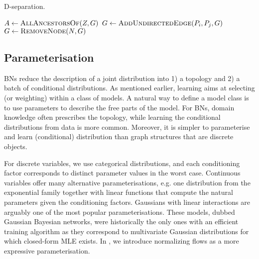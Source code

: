 \begin{algorithm}
\caption{D-separation.}\label{alg:d-separation}
  \begin{algorithmic}
      \State {}
      \State {}
      \State $A \gets \Call{AllAncestorsOf}{Z, G}$
       
          \State $G \gets \Call{AddUndirectedEdge}{P_i, P_j, G}$ 
        \EndIf
      \EndFor
        \State $G \gets \Call{RemoveNode}{N, G}$
      \EndFor
      \State {}
    \EndFunction
   \end{algorithmic}
\end{algorithm}

\subsection{Parameterisation}
BNs reduce the description of a joint distribution into 1) a topology and 2) a batch of conditional distributions. As mentioned earlier, learning aims at selecting (or weighting) within a class of models. A natural way to define a model class is to use parameters to describe the free parts of the model. For BNs, domain knowledge often prescribes the topology, while learning the conditional distributions from data is more common. Moreover, it is simpler to parameterise and learn (conditional) distribution than graph structures that are discrete objects.

For discrete variables, we use categorical distributions, and each conditioning factor corresponds to distinct parameter values in the worst case. Continuous variables offer many alternative parameterisations, e.g. one distribution from the exponential family together with linear functions that compute the natural parameters given the conditioning factors. Gaussians with linear interactions are arguably one of the most popular parameterisations. These models, dubbed Gaussian Bayesian networks, were historically the only ones with an efficient training algorithm as they correspond to multivariate Gaussian distributions \citep{wermuth1980linear} for which closed-form MLE exists. In , we introduce normalizing flows as a more expressive parameterisation.

